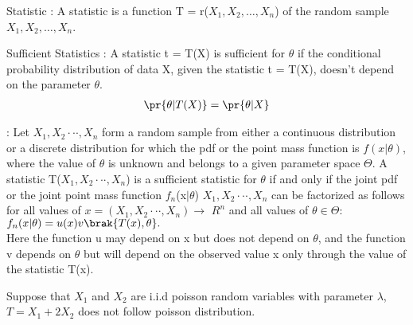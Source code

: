 \begin{definition}
    Statistic : A statistic is a function T = r($X_{1},X_{2},\dots,X_{n}$) of the random sample $X_{1},X_{2},\dots,X_{n}$.
  \end{definition}
  \begin{definition}
   Sufficient Statistics : A statistic t = T(X) is sufficient for $\theta$ if the conditional probability distribution of data X, given the statistic t = T(X), doesn't depend on the parameter $\theta$.
   \begin{align}
       \pr{\theta \vert T(X)}=\pr{\theta \vert X}
   \end{align}
  \end{definition}
  \begin{theorem}\label{poisson/4/factor}
   : Let $X_{1},X_{2} · · · , X_{n}$ form a random sample from either a continuous
distribution or a discrete distribution for which the pdf or the point mass function is $f(x\vert\theta)$,
where the value of $\theta$ is unknown and belongs to a given parameter space $\Theta$. A statistic
T($X_{1},X_{2} · · · , X_{n}$) is a sufficient statistic for $\theta$ if and only if the joint pdf or the joint point mass
function $f_{n}$(x$\vert\theta$) $X_{1},X_{2} · · · , X_{n}$ can be factorized as follows for all values of $x = (X_{1},X_{2} · · · , X_{n}) \to$
$R^{n}$ and all values of $\theta \in \Theta$:
$f_{n}(x\vert \theta) = u(x)v\brak{T(x), \theta}.$\\
Here the function u may depend on x but does not
depend on $\theta$, and the function v depends on $\theta$ but will depend on the observed value x only through the value of the statistic T(x).
  \end{theorem}
  \begin{lemma} \label{poisson/4/a}
Suppose that $X_{1}$ and $X_{2}$ are i.i.d poisson random variables with parameter $\lambda$, $T=X_{1}+2X_{2}$ does not follow poisson distribution.
\end{lemma}
